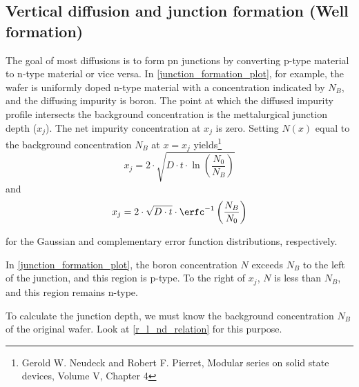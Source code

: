 \subsection{Vertical diffusion and junction formation (Well formation)}\label{building_wells}
The goal of most diffusions is to form pn junctions by converting p-type material to n-type material or vice versa.
In \autoref{junction_formation_plot}, for example, the wafer is uniformly doped n-type material with a concentration indicated by $N_B$, and the diffusing impurity is boron.
The point at which the diffused impurity profile intersects the background concentration is the mettalurgical junction depth ($x_j$).
The net impurity concentration at $x_j$ is zero.
Setting $N(x)$ equal to the background concentration $N_B$ at $x=x_j$ yields\footnote{Gerold W. Neudeck and Robert F. Pierret, Modular series on solid state devices, Volume V, Chapter 4}
\begin{equation}
x_j
=
2 \cdot\sqrt{D \cdot t \cdot \ln\left(\frac{N_0}{N_B}\right)}
\end{equation}
and
\begin{equation}
x_j
=
2 \cdot\sqrt{D \cdot t}
\cdot
\erfc^{-1}\left(\frac{N_B}{N_0}\right)
\end{equation}

for the Gaussian and complementary error function distributions, respectively.

In \autoref{junction_formation_plot}, the boron concentration $N$ exceeds $N_B$ to the left of the junction, and this region is p-type.
To the right of $x_j$, $N$ is less than $N_B$, and this region remains n-type.

To calculate the junction depth, we must know the background concentration $N_B$ of the original wafer.
Look at \autoref{r_l_nd_relation} for this purpose.

